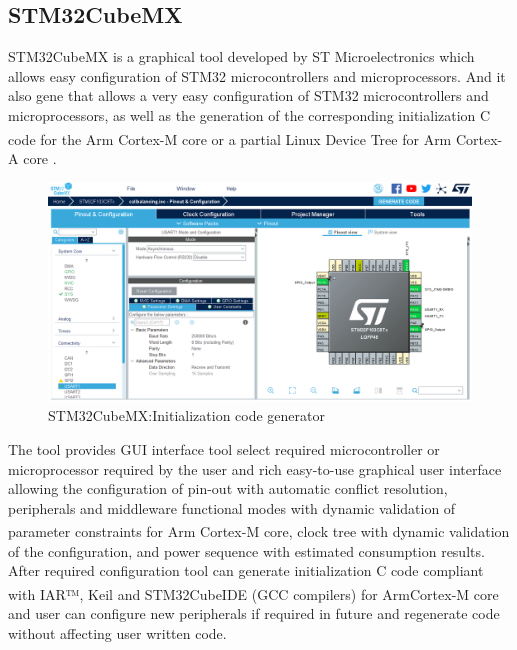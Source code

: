 \subsection{STM32CubeMX}

STM32CubeMX is a graphical tool developed by ST Microelectronics which allows easy configuration of STM32 microcontrollers and microprocessors. And it also gene
that allows a very easy configuration of STM32 microcontrollers and microprocessors, as well as the generation of the corresponding initialization C code for the Arm\textsuperscript{\textregistered} Cortex\textsuperscript{\textregistered}-M core or a partial Linux\textsuperscript{\textregistered} Device Tree for Arm\textsuperscript{\textregistered} Cortex\textsuperscript{\textregistered}-A core \cite{stm:cubemx}.

\begin{figure}[!h]
    \centering
    \includegraphics[scale=0.5]{Chapter4/cubemx.PNG}
    \caption{STM32CubeMX:Initialization code generator}
\end{figure}

The tool provides GUI interface tool select required microcontroller or microprocessor required by the user and rich easy-to-use graphical user interface allowing the configuration of pin-out with automatic conflict resolution, peripherals and middleware functional modes with dynamic validation of parameter constraints for Arm\textsuperscript{\textregistered} Cortex\textsuperscript{\textregistered}-M core, clock tree with dynamic validation of the configuration, and power sequence with estimated consumption results. After required configuration tool can generate initialization C code compliant with IAR™, Keil\textsuperscript{\textregistered} and STM32CubeIDE (GCC compilers) for Arm\textsuperscript{\textregistered}Cortex\textsuperscript{\textregistered}-M core and user can configure new peripherals if required in future and regenerate code without affecting user written code.

